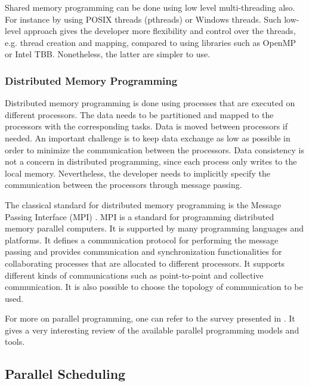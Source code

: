 Shared memory programming can be done using low level multi-threading also. For instance by using POSIX threads (pthreads) or Windows threads. Such low-level approach gives the developer more flexibility and control over the threads, e.g. thread creation and mapping, compared to using libraries such as OpenMP or Intel TBB. Nonetheless, the latter are simpler to use. 

\subsubsection{Distributed Memory Programming}

Distributed memory programming is done using processes that are executed on different processors. The data needs to be partitioned and mapped to the processors with the corresponding tasks. Data is moved between processors if needed. An important challenge is to keep data exchange as low as possible in order to minimize the communication between the processors. Data consistency is not a concern in distributed programming, since each process only writes to the local memory. Nevertheless, the developer needs to implicitly specify the communication between the processors through message passing.  

The classical standard for distributed memory programming is the Message Passing Interface (MPI) \cite{mpi}. MPI is a standard for programming distributed memory parallel computers. It is supported by many programming languages and platforms. It defines a communication protocol for performing the message passing and provides communication and synchronization functionalities for collaborating processes that are allocated to different processors. It supports different kinds of communications such as point-to-point and collective communication. It is also possible to choose the topology of communication to be used.

For more on parallel programming, one can refer to the survey presented in \cite{diaz:2012}. It gives a very interesting review of the available parallel programming models and tools.

\subsection{\label{subsec:parsched}Parallel Scheduling}

